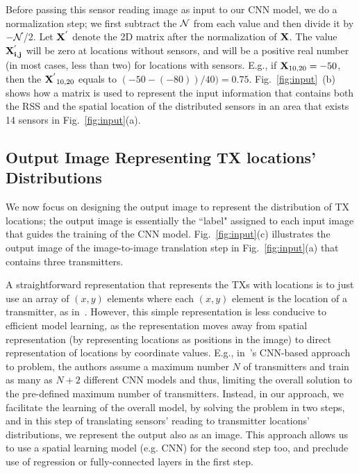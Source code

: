 Before passing this sensor reading image as input to our CNN model, we do a normalization step; we first subtract the $\cal{N}$ from each value and then divide it by $-\cal{N}$/2.
Let $\mathbf{X^{'}}$ denote the 2D matrix after the normalization of $\mathbf{X}$. 
The value $\mathbf{X^{'}_{i,j}}$ will be zero at locations without sensors, and \mxxij will be a positive real number (in most cases, less than two) for locations with sensors. E.g., if $\mathbf{X}_{10, 20}=-50$, then the 
$\mathbf{X^{'}}_{10, 20}$ equals to $(-50- (-80)) / 40) = 0.75$.
Fig.~\ref{fig:input}~(b) shows how a matrix is used to represent the input information that contains both the RSS and the spatial location of the distributed sensors in an area that exists 14 sensors in Fig.~\ref{fig:input}(a).






\subsection{Output Image Representing TX locations' Distributions}
\label{subsec:imgimg_output_image}
We now focus on designing the output image to represent the distribution of TX locations; 
the output image is essentially the ``label" assigned to each input image that guides the training of the CNN model. 
Fig.~\ref{fig:input}(c) illustrates the output image of the image-to-image translation step in Fig.~\ref{fig:input}(a) that contains three transmitters.

A straightforward representation that represents the TXs with locations is to just
use an array of $(x, y)$ elements where each $(x, y)$ element is the location of a 
transmitter, as in~\cite{icccn20-deeptxfinder}.
However, this simple representation is less conducive to efficient model learning,
as the representation moves away from spatial representation (by representing locations 
as positions in the image) to direct representation of locations by coordinate values.
E.g., in~\cite{icccn20-deeptxfinder}'s CNN-based approach to \mtl problem, the authors
assume a maximum number $N$ of transmitters and train as many as $N+2$ different CNN models
and thus, limiting the overall solution to the pre-defined maximum number of 
transmitters.
Instead, in our approach, we facilitate the learning of the overall model, by solving the
\mtl problem in two steps, and in this step of translating sensors' reading
to transmitter locations' distributions, we represent the output also as an image.
This approach allows us to use a spatial learning model (e.g. CNN) for the second step too, and preclude
use of regression or fully-connected layers in the first step. 


